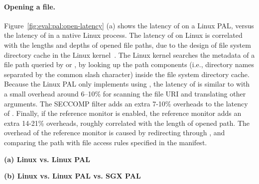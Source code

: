 \paragraph{Opening a file.}
Figure~\ref{fig:eval:pal:open-latency} (a) shows the latency of  on a Linux PAL, versus the latency of  \linuxapis{} in a native Linux process.
The latency of  \linuxapis{} on Linux is correlated with
the lengths and depths of opened file paths,
due to the design of file system directory cache
in the Linux kernel~\cite{tsai15dcache}.
The Linux kernel searches the metadata of a file path queried by  or , by looking up the path components (i.e., directory names separated by the common slash character)
inside the file system directory cache.
Because the Linux PAL only implements  using , the latency of  is similar to  with a small overhead around 6--10\% for
scanning the file URI and translating other \linuxapi{} arguments.
The SECCOMP filter adds an extra 7-10\% overheads to the latency of . Finally, if the reference monitor is enabled, the reference monitor adds an extra 14-21\% overheads, roughly correlated with the length of opened path.
The overhead of the reference monitor
is caused by redirecting  \linuxapis{} through , and comparing the path with file access rules specified in the manifest.  




\begin{figure*}[t!]
\centering
\footnotesize
{}
\parbox{0.49\textwidth}{\centering\bf (a) Linux vs. Linux PAL}
\parbox{0.49\textwidth}{\centering\bf (b) Linux vs. Linux PAL vs. SGX PAL}
\caption{Latency of  on Linux and SGX, and  \linuxapis{} in a native Linux process. Figure (a) shows the comparison between  \linuxapis{} and  on a Linux PAL,
with the options of enabling the SECCOMP filter ({\bf +SC})
and reference monitor ({\bf +RM}). Figure(b) shows the comparison between   \linuxapis{},  on a Linux PAL,
and  inside an SGX enclave, either with or without
integrity protection ({\bf +Shield}).}
\label{fig:eval:pal:open-latency}
\end{figure*}


